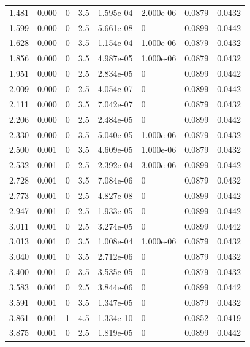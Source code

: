 \documentclass[preview]{standalone}
\begin{document}
{{\begin{tabular}{L{1.2cm}C{1.2cm} C{0.3cm}C{0.5cm} C{1.4cm}C{1.4cm} C{1.4cm}C{1.4cm}}
  1.481  &  0.000  & 0     & 3.5 &  1.595e-04  & 2.000e-06  & 0.0879 &  0.0432   \\ 
  1.599  &  0.000  & 0     & 2.5 &  5.661e-08  & 0  & 0.0899 &  0.0442   \\ 
  1.628  &  0.000  & 0     & 3.5 &  1.154e-04  & 1.000e-06  & 0.0879 &  0.0432   \\ 
  1.856  &  0.000  & 0     & 3.5 &  4.987e-05  & 1.000e-06  & 0.0879 &  0.0432   \\ 
  1.951  &  0.000  & 0     & 2.5 &  2.834e-05  & 0  & 0.0899 &  0.0442   \\ 
  2.009  &  0.000  & 0     & 2.5 &  4.054e-07  & 0  & 0.0899 &  0.0442   \\ 
  2.111  &  0.000  & 0     & 3.5 &  7.042e-07  & 0  & 0.0879 &  0.0432   \\ 
  2.206  &  0.000  & 0     & 2.5 &  2.484e-05  & 0  & 0.0899 &  0.0442   \\ 
  2.330  &  0.000  & 0     & 3.5 &  5.040e-05  & 1.000e-06  & 0.0879 &  0.0432   \\ 
  2.500  &  0.001  & 0     & 3.5 &  4.609e-05  & 1.000e-06  & 0.0879 &  0.0432   \\ 
  2.532  &  0.001  & 0     & 2.5 &  2.392e-04  & 3.000e-06  & 0.0899 &  0.0442   \\ 
  2.728  &  0.001  & 0     & 3.5 &  7.084e-06  & 0  & 0.0879 &  0.0432   \\ 
  2.773  &  0.001  & 0     & 2.5 &  4.827e-08  & 0  & 0.0899 &  0.0442   \\ 
  2.947  &  0.001  & 0     & 2.5 &  1.933e-05  & 0  & 0.0899 &  0.0442   \\ 
  3.011  &  0.001  & 0     & 2.5 &  3.274e-05  & 0  & 0.0899 &  0.0442   \\ 
  3.013  &  0.001  & 0     & 3.5 &  1.008e-04  & 1.000e-06  & 0.0879 &  0.0432   \\ 
  3.040  &  0.001  & 0     & 3.5 &  2.712e-06  & 0  & 0.0879 &  0.0432   \\ 
  3.400  &  0.001  & 0     & 3.5 &  3.535e-05  & 0  & 0.0879 &  0.0432   \\ 
  3.583  &  0.001  & 0     & 2.5 &  3.844e-06  & 0  & 0.0899 &  0.0442   \\ 
  3.591  &  0.001  & 0     & 3.5 &  1.347e-05  & 0  & 0.0879 &  0.0432   \\ 
  3.861  &  0.001  & 1     & 4.5 &  1.334e-10  & 0  & 0.0852 &  0.0419   \\ 
  3.875  &  0.001  & 0     & 2.5 &  1.819e-05  & 0  & 0.0899 &  0.0442   \\ 

\end{tabular}}}
\end{document}
